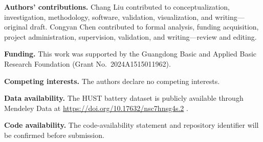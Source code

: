 \documentclass[pdflatex,sn-mathphys-num]{sn-jnl}
\begin{document}
\noindent\textbf{Authors' contributions.} Chang Liu contributed to conceptualization, investigation, methodology, software, validation, visualization, and writing---original draft. Congyan Chen contributed to formal analysis, funding acquisition, project administration, supervision, validation, and writing---review and editing.

\noindent\textbf{Funding.} This work was supported by the Guangdong Basic and Applied Basic Research Foundation (Grant No.~2024A1515011962).

\noindent\textbf{Competing interests.} The authors declare no competing interests.

\noindent\textbf{Data availability.} The HUST battery dataset is publicly available through Mendeley Data at \url{https://doi.org/10.17632/nsc7hnsg4s.2} \cite{Yuan2022HUSTDataset}.

\noindent\textbf{Code availability.} The code-availability statement and repository identifier will be confirmed before submission.


\end{document}
